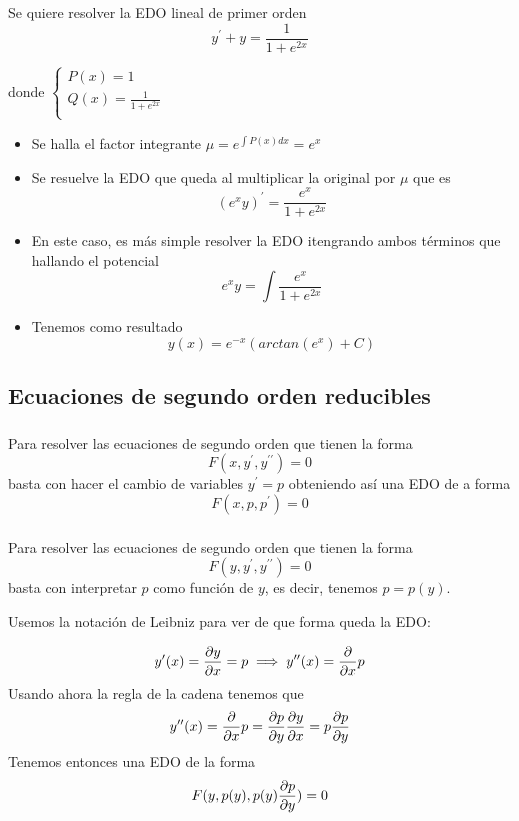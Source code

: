 \documentclass{mathnotes}
\begin{document}
\begin{example}
Se quiere resolver la EDO lineal de primer orden 
$$y^\prime + y = \frac{1}{1+e^{2x}}$$

donde 
$
  \left\lbrace
  \begin{array}{l}
     P(x) = 1 \\
     Q(x) = \frac{1}{1+e^{2x}} \\
  \end{array}
  \right.
$

\begin{itemize}
\item Se halla el factor integrante $\mu = e^{\int P(x)dx} = e^x$
\item Se resuelve la EDO que queda al multiplicar la original por $\mu$ que es
$$(e^xy)^\prime = \frac{e^x}{1+e^{2x}}$$
\item En este caso, es más simple resolver la EDO itengrando ambos términos que hallando el potencial
$$e^xy=\int \frac{e^x}{1+e^{2x}}$$
\item Tenemos como resultado
$$y(x) = e^{-x}(arctan (e^x) + C)$$
\end{itemize}
\end{example}

\subsection{Ecuaciones de segundo orden reducibles}
\subsubsection{}
Para resolver las ecuaciones de segundo orden que tienen la forma $$F(x, y^\prime, y^{\prime\prime}) = 0$$ basta con hacer el cambio de variables $y^\prime = p$ obteniendo así una EDO de a forma $$F(x, p, p^\prime) = 0$$

\subsubsection{}
Para resolver las ecuaciones de segundo orden que tienen la forma $$F(y,y^\prime, y^{\prime\prime}) = 0$$ basta con interpretar $p$ como función de $y$, es decir, tenemos $p = p(y)$.

Usemos la notación de Leibniz para ver de que forma queda la EDO:

$$y^\prime(x) = \partialder{x}{y} = p \implies y^{\prime\prime}(x) = \derivative{x}p$$
Usando ahora la regla de la cadena tenemos que 
$$y^{\prime\prime}(x) = \derivative{x}p = \partialder{y}{p}\partialder{x}{y} = p\partialder{y}{p}$$
Tenemos entonces una EDO de la forma $$F(y, p(y), p(y)\partialder{y}{p}) = 0$$
\end{document}

